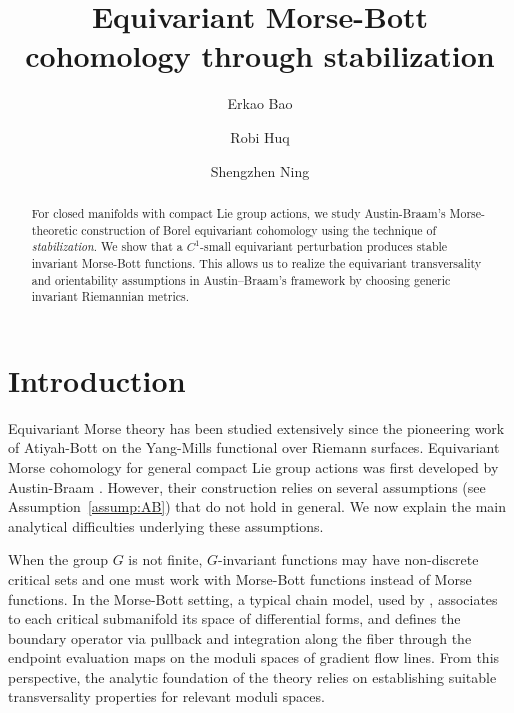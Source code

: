 \documentclass[11pt]{amsart}
\theoremstyle{definition}
\numberwithin{equation}{subsection}
\begin{document}
\title[Equivariant Morse-Bott cohomology through stabilization]{Equivariant Morse-Bott cohomology through stabilization}

\author{Erkao Bao}
\address{School of Mathematics, University of Minnesota, Minneapolis, MN 55455}

\author{Robi Huq}
\address{School of Mathematics, University of Minnesota, Minneapolis, MN 55455}

\author{Shengzhen Ning}
\address{School of Mathematics, University of Minnesota, Minneapolis, MN 55455}

\begin{abstract}
For closed manifolds with compact Lie group actions, we study Austin-Braam's Morse-theoretic construction of Borel equivariant cohomology using the technique of \emph{stabilization}. We show that a $C^1$-small equivariant perturbation produces stable invariant Morse-Bott functions. This allows us to realize the equivariant transversality and orientability assumptions in Austin–Braam’s framework by choosing generic invariant Riemannian metrics.
\end{abstract}

\maketitle

\setcounter{tocdepth}{2}
\section{Introduction}

Equivariant Morse theory has been studied extensively since the pioneering work of Atiyah-Bott \cite{atiyah1984moment} on the Yang-Mills functional over Riemann surfaces.  Equivariant Morse cohomology for general compact Lie group actions was first developed by Austin-Braam \cite{AustinBraam}.  However, their construction relies on several assumptions (see Assumption~\ref{assump:AB}) that do not hold in general. We now explain the main analytical difficulties underlying these assumptions.

When the group $G$ is not finite, $G$-invariant functions may have non-discrete critical sets and one must work with Morse-Bott functions instead of Morse functions. In the Morse-Bott setting, a typical chain model, used by 
\cite{AustinBraam}, associates to each critical submanifold its space of 
differential forms, and defines the boundary operator via pullback and 
integration along the fiber through the endpoint evaluation maps on the moduli 
spaces of gradient flow lines. From this perspective, the analytic foundation of 
the theory relies on establishing suitable transversality properties for relevant moduli spaces.
\end{document}
